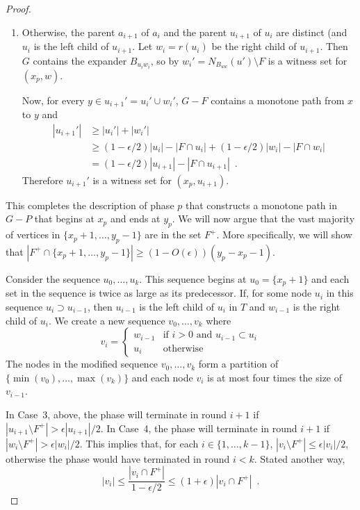 \documentclass{patmorin}
\begin{document}
\begin{proof}
\begin{enumerate}
   \item Otherwise, the parent $a_{i+1}$ of $a_i$ and the parent
   $u_{i+1}$ of $u_i$ are distinct (and $u_i$ is the left child
   of $u_{i+1}$.  Let $w_i=r(u_i)$ be the right child of $u_{i+1}$.
   Then $G$ contains the expander $B_{u_iw_i}$, so by 
   $w_i'=N_{B_{uw}}(u')\setminus F$ is a witness set for $(x_p,w)$.

   Now, for every $y\in u_{i+1}'=u_i'\cup w_i'$, $G-F$ contains a monotone
   path from $x$ to $y$ and
   \begin{align*}
	   |u_{i+1}'| 
	   & \ge |u_i'|+|w_i'| \\
	   & \ge (1-\epsilon/2)|u_{i}| - |F\cap u_i| + (1-\epsilon/2)|w_i| - |F\cap w_i| \\
	   &= (1-\epsilon/2)|u_{i+1}| - |F\cap u_{i+1}|  \enspace .
   \end{align*}
  Therefore $u_{i+1}'$ is a witness set for $(x_p,u_{i+1})$.
  \end{enumerate}

  This completes the description of phase $p$ that constructs a
  monotone path in $G-P$ that begins at $x_p$
  and ends at $y_p$.  We will now argue that the vast majority of
  vertices in $\{x_p+1,\ldots,y_p-1\}$ are in the set $F^+$.  More
  specifically, we will show that $|F^+\cap\{x_p+1,\ldots,y_p-1\}| \ge
  (1-O(\epsilon))(y_p-x_p-1)$.

  Consider the sequence $u_0,\ldots,u_k$.  This sequence begins at
  $u_0=\{x_p+1\}$ and each set in the sequence is twice as large as its
  predecessor.   If, for some node $u_i$ in this sequence $u_i\supset
  u_{i-1}$, then $u_{i-1}$ is the left child of $u_i$ in $T$ and
  $w_{i-1}$ is the right child of $u_i$.    We create a new sequence
  $v_0,\ldots,v_k$ where
  \[
    v_i = \begin{cases} 
	    w_{i-1} & \text{if $i>0$ and $u_{i-1}\subset u_i$} \\
	    u_i & \text{otherwise}
    \end{cases}
  \]
  The nodes in the modified sequence $v_0,\ldots,v_k$ form a partition
  of $\{\min(v_0),\ldots,\max(v_k)\}$ and each node $v_i$ is at most
  four times the size of $v_{i-1}$.

  In Case~3, above, the phase will terminate in round $i+1$ if
  $|u_{i+1}\setminus F^+|>\epsilon|u_{i+1}|/2$.  In Case~4, the phase
  will terminate in round $i+1$ if $|w_i\setminus F^+|>\epsilon|w_i|/2$.
  This implies that, for each $i\in\{1,\ldots,k-1\}$, $|v_i\setminus
  F^+|\le\epsilon|v_i|/2$, otherwise the phase would have terminated
  in round $i<k$.  Stated another way,
  \[
	  |v_i|\le \frac{|v_i\cap F^+|}{1-\epsilon/2} \le (1+\epsilon)|v_i\cap F^+| \enspace .
  \]


\end{proof}
\end{document}
